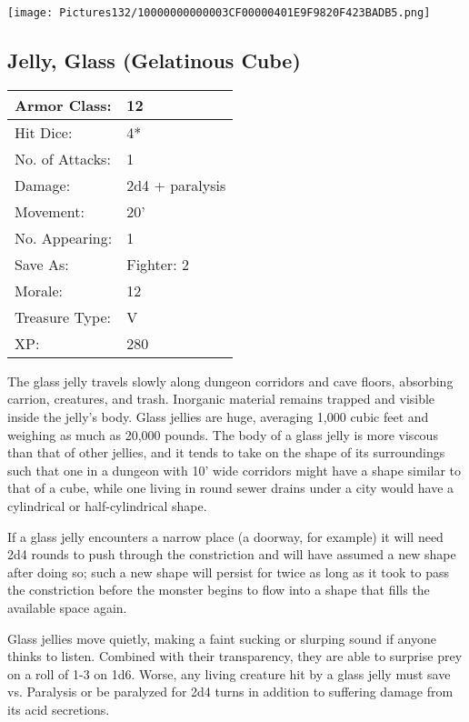 \documentclass[a4paper,twoside,openany,10pt]{book}
\begin{document}
\begin{multicols}{2}
\begin{center} \texttt{[image: Pictures132/10000000000003CF00000401E9F9820F423BADB5.png]} \end{center}

\subsection*{Jelly, Glass (Gelatinous Cube)}\label{jelly-glass-gelatinous-cube}

\begin{tabularx}{0.50\textwidth}{@{}lX@{}}
Armor Class: & 12 \\\hline
Hit Dice: & 4* \\\hline
No. of Attacks: & 1 \\\hline
Damage: & 2d4 + paralysis \\\hline
Movement: & 20' \\\hline
No. Appearing: & 1 \\\hline
Save As: & Fighter: 2 \\\hline
Morale: & 12 \\\hline
Treasure Type: & V \\\hline
XP: & 280 \\\hline
\end{tabularx}

The
glass jelly travels slowly along dungeon corridors and cave floors, absorbing carrion, creatures, and trash. Inorganic material remains trapped and visible inside the jelly's body. Glass jellies are huge, averaging 1,000 cubic feet and weighing as much as 20,000 pounds. The body of a glass jelly is more viscous than that of other jellies, and it tends to take on the shape of its surroundings such that one in a dungeon with 10' wide corridors might have a shape similar to that of a cube, while one living in round sewer drains under a city would have a cylindrical or half-cylindrical shape.

If a glass jelly encounters a narrow place (a doorway, for example) it will need 2d4 rounds to push through the constriction and will have assumed a new shape after doing so; such a new shape will persist for twice as long as it took to pass the constriction before the monster begins to flow into a shape that fills the available space again. 

Glass jellies move quietly, making a faint sucking or slurping sound if anyone thinks to listen. Combined with their transparency, they are able to surprise prey on a roll of 1-3 on 1d6. Worse, any living creature hit by a glass jelly must save vs. Paralysis or be paralyzed for 2d4 turns in addition to suffering damage from its acid secretions.


\end{multicols}
\end{document}
